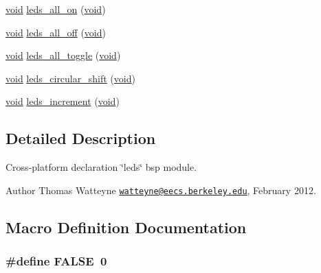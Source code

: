 \begin{DoxyCompactItemize}
\item 
\hyperlink{usb__devapi_8h_afabf60e7f57651d6d595a02c75f07cd0}{void} \hyperlink{group__leds_gac3092dd1fe1c3de1ecf54296e7daf0b6}{leds\+\_\+all\+\_\+on} (\hyperlink{usb__devapi_8h_afabf60e7f57651d6d595a02c75f07cd0}{void})
\item 
\hyperlink{usb__devapi_8h_afabf60e7f57651d6d595a02c75f07cd0}{void} \hyperlink{group__leds_ga24ed8c62f483ba89008b4062f7777a2b}{leds\+\_\+all\+\_\+off} (\hyperlink{usb__devapi_8h_afabf60e7f57651d6d595a02c75f07cd0}{void})
\item 
\hyperlink{usb__devapi_8h_afabf60e7f57651d6d595a02c75f07cd0}{void} \hyperlink{group__leds_gaf65df497068c0dd5c1563298dc87d180}{leds\+\_\+all\+\_\+toggle} (\hyperlink{usb__devapi_8h_afabf60e7f57651d6d595a02c75f07cd0}{void})
\item 
\hyperlink{usb__devapi_8h_afabf60e7f57651d6d595a02c75f07cd0}{void} \hyperlink{group__leds_gaa7592c1f5c7d250c0bafea1d29ff64ab}{leds\+\_\+circular\+\_\+shift} (\hyperlink{usb__devapi_8h_afabf60e7f57651d6d595a02c75f07cd0}{void})
\item 
\hyperlink{usb__devapi_8h_afabf60e7f57651d6d595a02c75f07cd0}{void} \hyperlink{group__leds_ga8dab59dd00dafd1644dfd57e59c8fc29}{leds\+\_\+increment} (\hyperlink{usb__devapi_8h_afabf60e7f57651d6d595a02c75f07cd0}{void})
\end{DoxyCompactItemize}


\subsection{Detailed Description}
Cross-\/platform declaration \char`\"{}leds\char`\"{} bsp module. 

\begin{DoxyAuthor}{Author}
Thomas Watteyne \href{mailto:watteyne@eecs.berkeley.edu}{\tt watteyne@eecs.\+berkeley.\+edu}, February 2012. 
\end{DoxyAuthor}


\subsection{Macro Definition Documentation}
\subsubsection[{\texorpdfstring{F\+A\+L\+SE}{FALSE}}]{\setlength{\rightskip}{0pt plus 5cm}\#define F\+A\+L\+SE~0}\hypertarget{group__leds_gaa93f0eb578d23995850d61f7d61c55c1}{}\label{group__leds_gaa93f0eb578d23995850d61f7d61c55c1}


